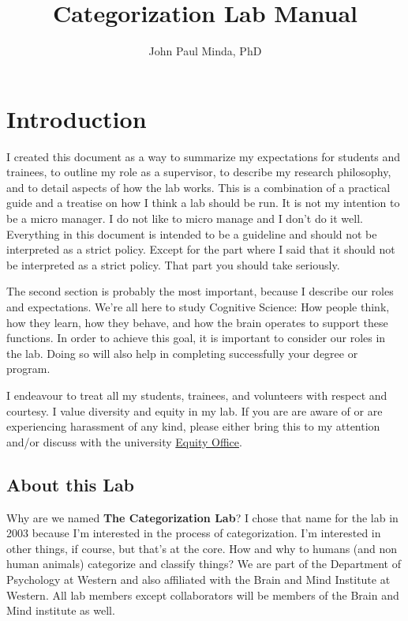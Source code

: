\documentclass{article}
\title{Categorization Lab Manual}
\author{John Paul Minda, PhD}
\begin{document}
\maketitle
\tableofcontents

\section{Introduction} 
I created this document as a way to summarize my expectations for students and trainees, to outline my role as a supervisor, to describe my research philosophy, and to detail aspects of how the lab works. This is a combination of a practical guide and a treatise on how I think a lab should be run. It is not my intention to be a micro manager. I do not like to micro manage and I don't do it well. Everything in this document is intended to be a guideline and should not be interpreted as a strict policy. Except for the part where I said that it should not be interpreted as a strict policy. That part you should take seriously.

The second section is probably the most important, because I describe our roles and expectations. We're all here to study Cognitive Science: How people think, how they learn, how they behave, and how the brain operates to support these functions. In order to achieve this goal, it is important to consider our roles in the lab. Doing so will also help in completing successfully your degree or program. 

I endeavour to treat all my students, trainees, and volunteers with respect and courtesy. I value diversity and equity in my lab. If you are are aware of or are experiencing harassment of any kind, please either bring this to my attention and/or discuss with the university \href{http://www.uwo.ca/equity/}{Equity Office}. 

\subsection{About this Lab}
Why are we named \textbf{The Categorization Lab}? I chose that name for the lab in 2003 because I'm interested in the process of categorization. I'm interested in other things, if course, but that's at the core. How and why to humans (and non human animals) categorize and classify things? We are part of the Department of Psychology at Western and also affiliated with the Brain and Mind Institute at Western. All lab members except collaborators will be members of the Brain and Mind institute as well.
\end{document}
